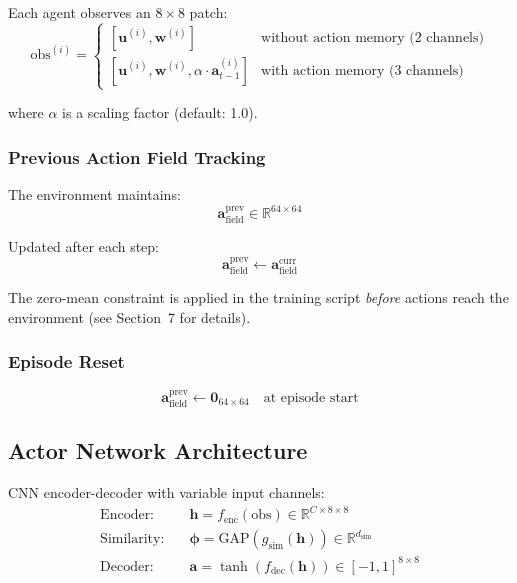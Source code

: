 \documentclass[11pt,a4paper]{article}
\newcommand{\R}{\mathbb{R}}
\theoremstyle{definition}
\begin{document}
Each agent observes an $8 \times 8$ patch:
\begin{equation}
    \text{obs}^{(i)} = \begin{cases}
        [\mathbf{u}^{(i)}, \mathbf{w}^{(i)}] & \text{without action memory (2 channels)} \\
        [\mathbf{u}^{(i)}, \mathbf{w}^{(i)}, \alpha \cdot \mathbf{a}_{t-1}^{(i)}] & \text{with action memory (3 channels)}
    \end{cases}
\end{equation}

where $\alpha$ is a scaling factor (default: 1.0).

\subsubsection{Previous Action Field Tracking}

The environment maintains:
\begin{equation}
    \mathbf{a}_{\text{field}}^{\text{prev}} \in \R^{64 \times 64}
\end{equation}

Updated after each step:
\begin{equation}
    \mathbf{a}_{\text{field}}^{\text{prev}} \leftarrow \mathbf{a}_{\text{field}}^{\text{curr}}
\end{equation}

The zero-mean constraint is applied in the training script \emph{before} actions reach the environment (see Section~7 for details).

\subsubsection{Episode Reset}
\begin{equation}
    \mathbf{a}_{\text{field}}^{\text{prev}} \leftarrow \mathbf{0}_{64 \times 64} \quad \text{at episode start}
\end{equation}

\subsection{Actor Network Architecture}

CNN encoder-decoder with variable input channels:
\begin{align}
    \text{Encoder:} \quad &\mathbf{h} = f_{\text{enc}}(\text{obs}) \in \R^{C \times 8 \times 8} \\
    \text{Similarity:} \quad &\boldsymbol{\phi} = \text{GAP}(g_{\text{sim}}(\mathbf{h})) \in \R^{d_{\text{sim}}} \\
    \text{Decoder:} \quad &\mathbf{a} = \tanh(f_{\text{dec}}(\mathbf{h})) \in [-1,1]^{8 \times 8}
\end{align}
\end{document}
